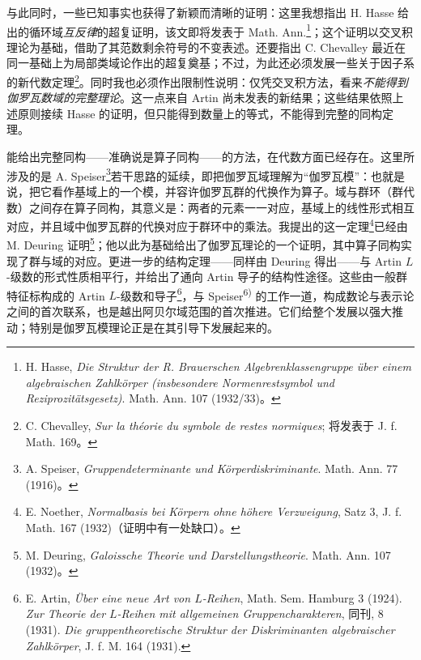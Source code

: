 \documentclass[11pt]{article}
\begin{document}
与此同时，一些已知事实也获得了新颖而清晰的证明：这里我想指出 H. Hasse 给出的循环域\emph{互反律}的超复证明，该文即将发表于 Math. Ann.\footnote{H. Hasse, \emph{Die Struktur der R. Brauerschen Algebrenklassengruppe über einem algebraischen Zahlkörper (insbesondere Normenrestsymbol und Reziprozitätsgesetz)}. Math. Ann. 107 (1932/33)。}；这个证明以交叉积理论为基础，借助了其范数剩余符号的不变表述。还要指出 C. Chevalley 最近在同一基础上为局部类域论作出的超复奠基；不过，为此还必须发展一些关于因子系的新代数定理\footnote{C. Chevalley, \emph{Sur la théorie du symbole de restes normiques}; 将发表于 J. f. Math. 169。}。同时我也必须作出限制性说明：仅凭交叉积方法，看来\emph{不能得到伽罗瓦数域的完整理论}。这一点来自 Artin 尚未发表的新结果；这些结果依照上述原则接续 Hasse 的证明，但只能得到数量上的等式，不能得到完整的同构定理。

能给出完整同构——准确说是算子同构——的方法，在代数方面已经存在。这里所涉及的是 A. Speiser\footnote{A. Speiser, \emph{Gruppendeterminante und Körperdiskriminante}. Math. Ann. 77 (1916)。}若干思路的延续，即把伽罗瓦域理解为“伽罗瓦模”：也就是说，把它看作基域上的一个模，并容许伽罗瓦群的代换作为算子。域与群环（群代数）之间存在算子同构，其意义是：两者的元素一一对应，基域上的线性形式相互对应，并且域中伽罗瓦群的代换对应于群环中的乘法。我提出的这一定理\footnote{E. Noether, \emph{Normalbasis bei Körpern ohne höhere Verzweigung}, Satz 3, J. f. Math. 167 (1932)（证明中有一处缺口）。}已经由 M. Deuring 证明\footnote{M. Deuring, \emph{Galoissche Theorie und Darstellungstheorie}. Math. Ann. 107 (1932)。}；他以此为基础给出了伽罗瓦理论的一个证明，其中算子同构实现了群与域的对应。更进一步的结构定理——同样由 Deuring 得出——与 Artin \(L\)-级数的形式性质相平行，并给出了通向 Artin 导子的结构性途径。这些由一般群特征标构成的 Artin \(L\)-级数和导子\footnote{E. Artin, \emph{Über eine neue Art von \(L\)-Reihen}, Math. Sem. Hamburg 3 (1924). \emph{Zur Theorie der \(L\)-Reihen mit allgemeinen Gruppencharakteren}, 同刊, 8 (1931). \emph{Die gruppentheoretische Struktur der Diskriminanten algebraischer Zahlkörper}, J. f. M. 164 (1931).}，与 Speiser\textsuperscript{6)} 的工作一道，构成数论与表示论之间的首次联系，也是越出阿贝尔域范围的首次推进。它们给整个发展以强大推动；特别是伽罗瓦模理论正是在其引导下发展起来的。
\end{document}
